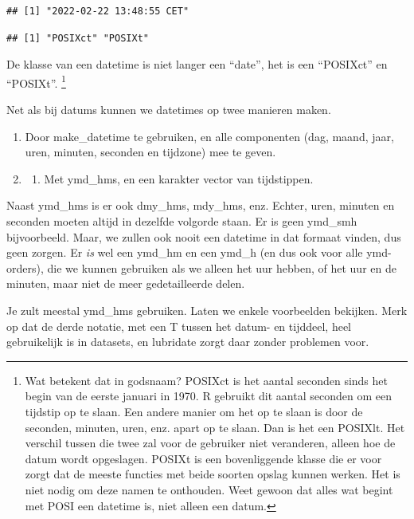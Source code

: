 \documentclass[]{tufte-book}
\providecommand{\tightlist}{%
  \setlength{\itemsep}{0pt}\setlength{\parskip}{0pt}}
\begin{document}
\begin{verbatim}
## [1] "2022-02-22 13:48:55 CET"
\end{verbatim}

\begin{verbatim}
## [1] "POSIXct" "POSIXt"
\end{verbatim}

De klasse van een datetime is niet langer een ``date'', het is een ``POSIXct'' en ``POSIXt''. \footnote{Wat betekent dat in godsnaam? POSIXct is het aantal seconden sinds het begin van de eerste januari in 1970. R gebruikt dit aantal seconden om een tijdstip op te slaan. Een andere manier om het op te slaan is door de seconden, minuten, uren, enz. apart op te slaan. Dan is het een POSIXlt. Het verschil tussen die twee zal voor de gebruiker niet veranderen, alleen hoe de datum wordt opgeslagen. POSIXt is een bovenliggende klasse die er voor zorgt dat de meeste functies met beide soorten opslag kunnen werken. Het is niet nodig om deze namen te onthouden. Weet gewoon dat alles wat begint met POSI een datetime is, niet alleen een datum.}

Net als bij datums kunnen we datetimes op twee manieren maken.

\begin{enumerate}
\def\labelenumi{\arabic{enumi}.}
\item
  Door make\_datetime te gebruiken, en alle componenten (dag, maand, jaar, uren, minuten, seconden en tijdzone) mee te geven.
\item
  \begin{enumerate}
  \def\labelenumii{\arabic{enumii}.}
  \setcounter{enumii}{1}
  \tightlist
  \item
    Met ymd\_hms, en een karakter vector van tijdstippen.
  \end{enumerate}
\end{enumerate}

Naast ymd\_hms is er ook dmy\_hms, mdy\_hms, enz. Echter, uren, minuten en seconden moeten altijd in dezelfde volgorde staan. Er is geen ymd\_smh bijvoorbeeld. Maar, we zullen ook nooit een datetime in dat formaat vinden, dus geen zorgen. Er \emph{is} wel een ymd\_hm en een ymd\_h (en dus ook voor alle ymd-orders), die we kunnen gebruiken als we alleen het uur hebben, of het uur en de minuten, maar niet de meer gedetailleerde delen.

Je zult meestal ymd\_hms gebruiken. Laten we enkele voorbeelden bekijken. Merk op dat de derde notatie, met een T tussen het datum- en tijddeel, heel gebruikelijk is in datasets, en lubridate zorgt daar zonder problemen voor.
\end{document}
